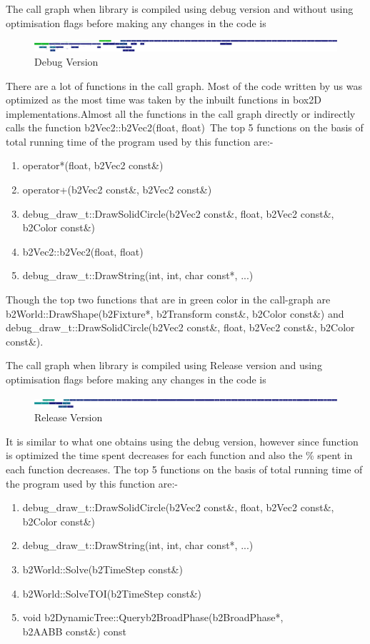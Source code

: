 \documentclass[a4paper,12pt]{article}
\begin{document}
The call graph when library is compiled using debug version and without using optimisation flags  before making any changes in the code is
\begin{figure}[h]
  \centering
  \includegraphics[scale = 0.04]{Report/images/call_graph.png}
  \caption{Debug Version}
\end{figure}
There are a lot of functions in the call graph. Most of the code written by us was optimized as the most time was taken by the inbuilt functions in box2D implementations.Almost all the functions in the call graph directly or indirectly calls the function b2Vec2::b2Vec2(float, float)\
The top 5 functions on the basis of total running time of the program used by this function are:-
\begin{enumerate}
\item operator*(float, b2Vec2 const\&)
\item operator+(b2Vec2 const\&, b2Vec2 const\&)
\item debug\_draw\_t::DrawSolidCircle(b2Vec2 const\&, float, b2Vec2 const\&,\\
 b2Color const\&)
\item b2Vec2::b2Vec2(float, float)
\item debug\_draw\_t::DrawString(int, int, char const*, ...)
\end{enumerate}

Though the top two functions that are in green color in the call-graph are b2World::DrawShape(b2Fixture*, b2Transform const\&, b2Color const\&)
and debug\_draw\_t::DrawSolidCircle(b2Vec2 const\&, float, b2Vec2 const\&, b2Color const\&).

The call graph when library is compiled using Release version and using optimisation flags before making any changes in the code is
\begin{figure}[h]
  \centering
  \includegraphics[scale = 0.04]{Report/images/call_graphRelease.png}
  \caption{Release Version}
\end{figure}

It is similar to what one obtains using the debug version, however since function is optimized the time spent decreases for each function and also 
the \% spent in each function decreases.
The top 5 functions on the basis of total running time of the program used by this function are:-
\begin{enumerate}
\item debug\_draw\_t::DrawSolidCircle(b2Vec2 const\&, float, b2Vec2 const\&,\\ b2Color const\&)
\item debug\_draw\_t::DrawString(int, int, char const*, ...)
\item b2World::Solve(b2TimeStep const\&)
\item b2World::SolveTOI(b2TimeStep const\&)
\item void b2DynamicTree::Query\textlangle{}b2BroadPhase\textrangle{}(b2BroadPhase*,\\b2AABB const\&) const
\end{enumerate}
\end{document}
